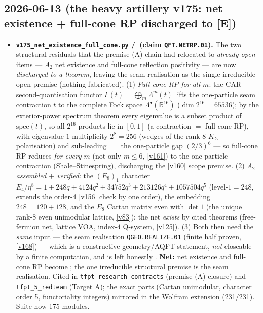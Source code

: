 \subsection*{2026-06-13 (the heavy artillery v175: net existence + full-cone RP discharged to [E])}
\begin{itemize}
\item \textbf{\texttt{v175\_net\_existence\_full\_cone.py} \mE/\mO\ (claim \texttt{QFT.NETRP.01}).}
  The two structural residuals that the premise-(A) chain had relocated to \emph{already-open}
  items --- $A_2$ net existence and full-cone reflection positivity --- are now \emph{discharged
  to a theorem}, leaving the seam realisation as the single irreducible open premise (nothing
  fabricated). (1) \emph{Full-cone RP for all $m$}: the CAR second-quantisation functor
  $\Gamma(t)=\bigoplus_m\Lambda^m(t)$ lifts the one-particle seam contraction $t$ to the complete
  Fock space $\Lambda^\bullet(\mathbb R^{16})$ ($\dim 2^{16}=65536$); by the exterior-power
  spectrum theorem every eigenvalue is a subset product of $\mathrm{spec}(t)$, so all $2^{16}$
  products lie in $[0,1]$ (a contraction $=$ full-cone RP), with eigenvalue-$1$ multiplicity
  $2^8=256$ (wedges of the rank-$8$ $K_\Sigma$ polarisation) and sub-leading $=$ the one-particle
  gap $(2/3)^6$ --- so full-cone RP reduces \emph{for every $m$} (not only $m\le6$, \vref{v161}) to
  the one-particle contraction (Shale--Stinespring), discharging the \vref{v160} scope premise.
  (2) \emph{$A_2$ assembled $+$ verified}: the $(E_8)_1$ character
  $E_4/\eta^8=1+248q+4124q^2+34752q^3+213126q^4+1057504q^5$ (level-$1=248$, extends the order-4
  \vref{v156} check by one order), the embedding $248=120+128$, and the $E_8$ Cartan matrix even
  with $\det 1$ (the unique rank-$8$ even unimodular lattice, \vref{v83}); the net \emph{exists} by
  cited theorems (free-fermion net, lattice VOA, index-$4$ Q-system, \vref{v125}). (3) Both then
  need the \emph{same} input --- the seam realisation \texttt{QGEO.REALIZE.01} (finite half proven,
  \vref{v168}) --- which is a constructive-geometry/AQFT statement, \emph{not} closeable by a finite
  computation, and is left honestly \mO. \textbf{Net:} net existence and full-cone RP become \mE;
  the one irreducible structural premise is the seam realisation. Cited in
  \texttt{tfpt\_research\_contracts} (premise (A) closure) and \texttt{tfpt\_5\_redteam} (Target A);
  the exact parts (Cartan unimodular, character order 5, functoriality integers) mirrored in the
  Wolfram extension (231/231). Suite now 175 modules.
\end{itemize}


